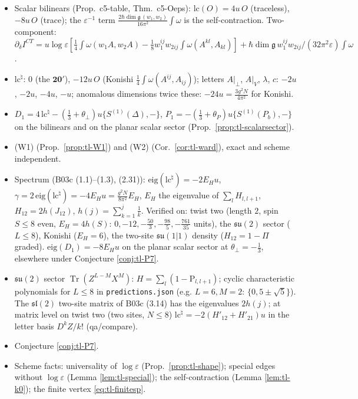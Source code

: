 \documentclass[11pt]{article}
\numberwithin{equation}{section}
\theoremstyle{plain}
\theoremstyle{definition}
\begin{document}
\begin{itemize}
\item[P1] Scalar bilinears (Prop.~c5-table, Thm.~c5-Oeps): $\mathrm{lc}(O)=4u\,O$ (traceless), $-8u\,O$ (trace); the $\varepsilon^{-1}$ term $\frac{2\hbar\dim\mathfrak g\,(w_1,w_2)}{16\pi^2}\int\omega$ is the self-contraction. Two-component: $\partial_\delta I^{CT}=u\log\varepsilon[\tfrac14\int\omega(w_1A,w_2A)-\tfrac18w_1^{ij}w_{2ij}\int\omega(A^{kl},A_{kl})]+\hbar\dim\mathfrak g\,w_1^{ij}w_{2ij}/(32\pi^2\varepsilon)\int\omega$.
\item[P2] $\mathrm{lc}^\natural$: $0$ (the $\mathbf{20'}$), $-12u\,O$ (Konishi $\tfrac14\int\omega(A^{ij},A_{ij})$); letters $A|_\perp$, $A|_V$, $\lambda$, $c$: $-2u$, $-2u$, $-4u$, $-u$; anomalous dimensions twice these: $-24u=\frac{3g^2N}{4\pi^2}$ for Konishi.
\item[P3] $D_1=4\,\mathrm{lc}^\natural-(\tfrac13+\theta_\perp)u\{S^{(1)}(\Delta),-\}$, $P_1=-(\tfrac13+\theta_P)u\{S^{(1)}(P_b),-\}$ on the bilinears and on the planar scalar sector (Prop.~\ref{prop:tl-scalarsector}).
\item[P4] (W1) (Prop.~\ref{prop:tl-W1}) and (W2) (Cor.~\ref{cor:tl-ward}), exact and scheme independent.
\item[P5] Spectrum (B03c (1.1)--(1.3), (2.31)): $\mathrm{eig}(\mathrm{lc}^\natural)=-2E_Hu$, $\gamma=2\,\mathrm{eig}(\mathrm{lc}^\natural)=-4E_Hu=\frac{g^2N}{8\pi^2}E_H$, $E_H$ the eigenvalue of $\sum_lH_{l,l+1}$, $H_{12}=2h(J_{12})$, $h(j)=\sum_{k=1}^j\frac1k$. Verified on: twist two (length $2$, spin $S\le8$ even, $E_H=4h(S)$: $0,-12,-\tfrac{50}3,-\tfrac{98}5,-\tfrac{761}{35}$ units), the $\mathfrak{su}(2)$ sector ($L\le8$), Konishi ($E_H=6$), the two-site $\mathfrak{su}(1|1)$ density ($H_{12}=1-\Pi$ graded). $\mathrm{eig}(D_1)=-8E_Hu$ on the planar scalar sector at $\theta_\perp=-\tfrac13$, elsewhere under Conjecture \ref{conj:tl-P7}.
\item[P6] $\mathfrak{su}(2)$ sector $\operatorname{Tr}(Z^{L-M}X^M)$: $H=\sum_l(1-\mathrm P_{l,l+1})$; cyclic characteristic polynomials for $L\le8$ in \texttt{predictions.json} (e.g. $L=6,M=2$: $\{0,5\pm\sqrt5\}$). The $\mathfrak{sl}(2)$ two-site matrix of B03c (3.14) has the eigenvalues $2h(j)$; at matrix level on twist two (two sites, $N\le8$) $\mathrm{lc}^\natural=-2(H'_{12}+H'_{21})u$ in the letter basis $D^kZ/k!$ (qa/compare).
\item[P7] Conjecture \ref{conj:tl-P7}.
\item[P8] Scheme facts: universality of $\log\varepsilon$ (Prop.~\ref{prop:tl-shape}); special edges without $\log\varepsilon$ (Lemma \ref{lem:tl-special}); the self-contraction (Lemma \ref{lem:tl-k0}); the finite vertex \eqref{eq:tl-finitesp}.
\end{itemize}
\end{document}

